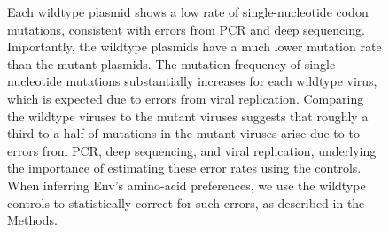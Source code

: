 \documentclass[9pt,lineno]{elife}
\begin{document}
\begin{figure}
{Each wildtype plasmid shows a low rate of single-nucleotide codon mutations, consistent with errors from PCR and deep sequencing.
Importantly, the wildtype plasmids have a much lower mutation rate than the mutant plasmids.
The mutation frequency of single-nucleotide mutations substantially increases for each wildtype virus, which is expected due to errors from viral replication.
Comparing the wildtype viruses to the mutant viruses suggests that roughly a third to a half of mutations in the mutant viruses arise due to to errors from PCR, deep sequencing, and viral replication, underlying the importance of estimating these error rates using the controls.
When inferring Env's amino-acid preferences, we use the wildtype controls to statistically correct for such errors, as described in the Methods.
}
\end{figure}
\end{document}
